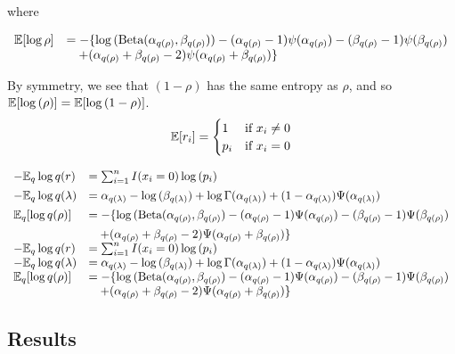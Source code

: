 \documentclass{amsart}[12pt]
\begin{document}
where

$$
\begin{array}{ll}
{\mathbb E}[\log{\rho}] &= -\{ \log{(\text{Beta}(\alpha_{q(\rho)}, \beta_{q(\rho)}))} - (\alpha_{q(\rho)} - 1) \psi{(\alpha_{q(\rho)})} - (\beta_{q(\rho)} - 1)\psi{(\beta_{q(\rho)})} \\
&\quad + (\alpha_{q(\rho)} + \beta_{q(\rho)} - 2)\psi{(\alpha_{q(\rho)} + \beta_{q(\rho)})} \} 
\end{array}
$$

By symmetry, we see that $(1 - \rho)$ has the same entropy as $\rho$,
and so ${\mathbb E} [\log{(\rho)}] = {\mathbb E} [\log{(1 - \rho)}]$.
$$
{\mathbb E}[r_i] = 
	\begin{cases}
	1 & \text{if } x_i \ne 0 \\
	p_i & \text{if } x_i = 0 \\
	\end{cases}
$$

$$
\begin{array}{ll}
-{\mathbb E}_q \log{q(r)} &= \sum_{i=1}^n I(x_i = 0) \log{(p_i)} \\ [1ex]
-{\mathbb E}_q \log{q(\lambda)} &= \alpha_{q(\lambda)} - \log{(\beta_{q(\lambda)})} + \log{\Gamma{(\alpha_{q(\lambda)})}} + (1 - \alpha_{q(\lambda)}) \Psi{(\alpha_{q(\lambda)})} \\ [1ex]
{\mathbb E}_q[\log{q(\rho)}] &= - \{ \log{(\text{Beta}(\alpha_{q(\rho)}, \beta_{q(\rho)})} - (\alpha_{q(\rho)} - 1) \Psi{(\alpha_{q(\rho)})} - (\beta_{q(\rho)} - 1)\Psi{(\beta_{q(\rho)})} \\ [1ex]
    & \displaystyle \quad + (\alpha_{q(\rho)} + \beta_{q(\rho)} - 2)\Psi{(\alpha_{q(\rho)} + \beta_{q(\rho)})} \} \\
-{\mathbb E}_q \log{q(r)} &= \sum_{i=1}^n I(x_i = 0) \log{(p_i)} \\
-{\mathbb E}_q \log{q(\lambda)} &= \alpha_{q(\lambda)} - \log{(\beta_{q(\lambda)})} + \log{\Gamma{(\alpha_{q(\lambda)})}} + (1 - \alpha_{q(\lambda)}) \Psi{(\alpha_{q(\lambda)})} \\
{\mathbb E}_q[\log{q(\rho)}] &= - \{ \log{(\text{Beta}(\alpha_{q(\rho)}, \beta_{q(\rho)})} - (\alpha_{q(\rho)} - 1) \Psi{(\alpha_{q(\rho)})} - (\beta_{q(\rho)} - 1)\Psi{(\beta_{q(\rho)})} \\
&\quad + (\alpha_{q(\rho)} + \beta_{q(\rho)} - 2)\Psi{(\alpha_{q(\rho)} + \beta_{q(\rho)})} \} \\
\end{array}
$$

\subsection{Results}
\end{document}
